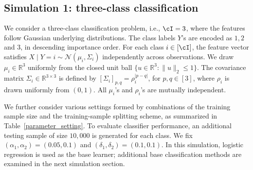 \subsection{Simulation 1: three-class classification}

We consider a three-class classification problem, i.e.,  $\cI = 3$, where the features follow Gaussian underlying distributions. The class labels $Y$'s are encoded as $1,2$ and $3$, in descending importance order. For each class $i \in [\cI]$, the feature vector satisfies $X\mid Y = i \sim \mathcal{N}(\mu_i, \Sigma_i)$ independently across observations. We draw $\mu_i \in \mathbb{R}^3$ uniformly from the closed unit ball
$\{u \in \mathbb{R}^3 : \|u\|_2 \le 1\}$. The covariance matrix
$\Sigma_i \in \mathbb{R}^{3 \times 3}$ is defined by $
[\Sigma_i]_{p,q} = \rho_i^{|p-q|}$, for $ p,q \in [3]$,
where $\rho_i$ is drawn uniformly from $(0,1)$. All $\mu_i$'s and
$\rho_i$'s are mutually independent. 






We further consider various settings formed by combinations of the training sample size and the training-sample splitting scheme, as summarized in Table~\ref{parameter_setting}.  To evaluate classifier performance, an additional testing sample of size $10,000$ is generated for each class. We fix $(\alpha_1, \alpha_2) = (0.05, 0.1)$ and $(\delta_1, \delta_2) = (0.1, 0.1)$. In this simulation, logistic regression is used as the base learner; additional base classification methods are examined in the next simulation section. 



